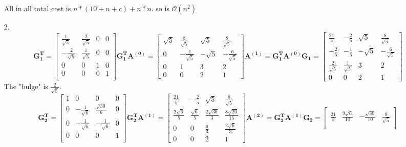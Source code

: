 \documentclass[english,onecolumn]{IEEEtran}
\newcommand{\bigO}{\mathcal{O}}
\begin{document}
\begin{enumerate}
	All in all total cost is $n*(10 + n + c) + n*n.$  so is $\bigO(n^2)$
    \item[2.]
    $$\mathbf{G_1^T}=\begin{bmatrix}
    	\frac{1}{\sqrt{5}} & \frac{2}{\sqrt{5}} & 0 & 0 \\
    	-\frac{2}{\sqrt{5}} & \frac{1}{\sqrt{5}} & 0 & 0 \\
    	0 & 0 & 1 & 0 \\
    	0 & 0 & 0 & 1 \\
    \end{bmatrix}
    \mathbf{G_1^TA^{(0)}}=\begin{bmatrix}
    	\sqrt{5} &\frac{8}{\sqrt{5}} &\sqrt{5} &\frac{8}{\sqrt{5}} \\
    	0 & -\frac{1}{\sqrt{5}} &-\sqrt{5} & -\frac{6}{\sqrt{5}} \\
    	0 & 1 & 3 & 2\\
    	0 & 0 & 2 &1
    \end{bmatrix}
    \mathbf{A^{(1)}}=\mathbf{G_1^TA^{(0)}G_1} =\begin{bmatrix}
    	\frac{21}{5} & -\frac{2}{5} & \sqrt{5} & \frac{8}{\sqrt{5}}\\
    	-\frac{2}{5} &-\frac{1}{5} &-\sqrt{5} & -\frac{6}{\sqrt{5}}\\
    	\frac{2}{\sqrt{5}} & \frac{1}{\sqrt{5}} &3 &2 \\
    	0 & 0 & 2 & 1
    \end{bmatrix}
    $$
    The "bulge" is $\frac{2}{\sqrt{5}}$.
    $$\mathbf{G_2^T}=\begin{bmatrix}
    	1 & 0 & 0 & 0 \\
    	0& -\frac{1}{\sqrt{6}} & \frac{\sqrt{30}}{6} & 0 \\
    	0 & -\frac{1}{\sqrt{6}} & -\frac{1}{\sqrt{6}} & 0 \\
    	0 & 0 & 0 & 1 \\
    \end{bmatrix}
    \mathbf{G_2^TA^{(1)}}=\begin{bmatrix}
    	\frac{21}{5}&-\frac{2}{5} &\sqrt{5} &\frac{8}{\sqrt{5}} \\
    	\frac{2\sqrt{6}}{5} & \frac{\sqrt{6}}{5} &\frac{2\sqrt{30}}{3} & \frac{8\sqrt{20}}{15} \\
    	0 & 0 & \frac{6}{3} & \frac{2\sqrt{6}}{3}\\
    	0 & 0 & 2 &1
    \end{bmatrix}
    \mathbf{A^{(2)}}=\mathbf{G_2^TA^{(1)}G_2} =\begin{bmatrix}
    	\frac{21}{5} & \frac{9\sqrt{6}}{10} & -\frac{\sqrt{30}}{10} & \frac{8}{\sqrt{5}}\\

\end{bmatrix}$$
\end{enumerate}
\end{document}
